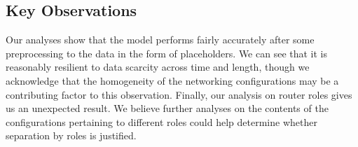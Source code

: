 \subsection{Key Observations}
Our analyses show that the model performs fairly accurately after some preprocessing to the data in the form of placeholders. We can see that it is reasonably resilient to data scarcity across time and length, though we acknowledge that the homogeneity of the networking configurations may be a contributing factor to this observation. Finally, our analysis on router roles gives us an unexpected result. We believe further analyses on the contents of the configurations pertaining to different roles could help determine whether separation by roles is justified.
